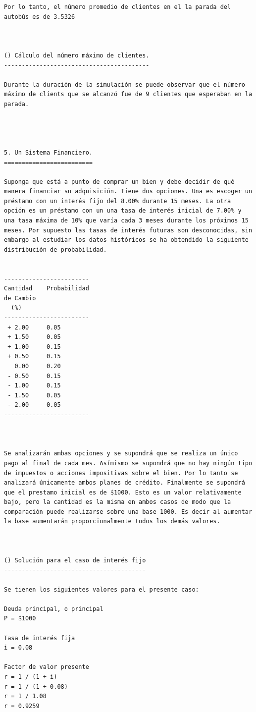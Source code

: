 \begin{verbatim}
Por lo tanto, el número promedio de clientes en el la parada del autobús es de 3.5326



() Cálculo del número máximo de clientes.
-----------------------------------------

Durante la duración de la simulación se puede observar que el número máximo de clients que se alcanzó fue de 9 clientes que esperaban en la parada.




5. Un Sistema Financiero.
=========================

Suponga que está a punto de comprar un bien y debe decidir de qué manera financiar su adquisición. Tiene dos opciones. Una es escoger un préstamo con un interés fijo del 8.00% durante 15 meses. La otra opción es un préstamo con un una tasa de interés inicial de 7.00% y una tasa máxima de 10% que varía cada 3 meses durante los próximos 15 meses. Por supuesto las tasas de interés futuras son desconocidas, sin embargo al estudiar los datos históricos se ha obtendido la siguiente distribución de probabilidad.


------------------------
Cantidad    Probabilidad
de Cambio
  (%)
------------------------
 + 2.00     0.05
 + 1.50     0.05
 + 1.00     0.15
 + 0.50     0.15
   0.00     0.20
 - 0.50     0.15
 - 1.00     0.15
 - 1.50     0.05
 - 2.00     0.05
------------------------



Se analizarán ambas opciones y se supondrá que se realiza un único pago al final de cada mes. Asímismo se supondrá que no hay ningún tipo de impuestos o acciones impositivas sobre el bien. Por lo tanto se analizará únicamente ambos planes de crédito. Finalmente se supondrá que el prestamo inicial es de $1000. Esto es un valor relativamente bajo, pero la cantidad es la misma en ambos casos de modo que la comparación puede realizarse sobre una base 1000. Es decir al aumentar la base aumentarán proporcionalmente todos los demás valores.



() Solución para el caso de interés fijo
----------------------------------------

Se tienen los siguientes valores para el presente caso:

Deuda principal, o principal 
P = $1000

Tasa de interés fija         
i = 0.08

Factor de valor presente
r = 1 / (1 + i)
r = 1 / (1 + 0.08)
r = 1 / 1.08
r = 0.9259



\end{verbatim}
